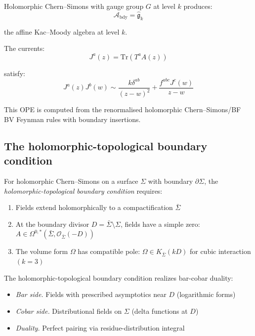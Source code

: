 \begin{example}
Holomorphic Chern--Simons with gauge group $G$ at level $k$ produces:
\[\mathcal{A}_{\text{bdy}} = \widehat{\mathfrak{g}}_k\]

the affine Kac--Moody algebra at level $k$.

The currents:
\[J^a(z) = \text{Tr}(T^a A(z))\]

satisfy:
\[J^a(z) J^b(w) \sim \frac{k \delta^{ab}}{(z-w)^2} +
\frac{f^{abc} J^c(w)}{z-w}\]

This OPE is computed from the renormalised holomorphic
Chern--Simons/BF BV Feynman rules with boundary insertions.
\end{example}

\subsection{The holomorphic-topological boundary condition}

\begin{definition}
For holomorphic Chern--Simons on a surface $\Sigma$ with boundary $\partial \Sigma$,
the \emph{holomorphic-topological boundary condition} requires:
\begin{enumerate}
\item Fields extend holomorphically to a compactification $\bar{\Sigma}$
\item At the boundary divisor $D = \bar{\Sigma} \setminus \Sigma$, fields have
a simple zero: $A \in \Omega^{0,*}(\bar{\Sigma}, \mathcal{O}_{\bar{\Sigma}}(-D))$
\item The volume form $\Omega$ has compatible pole: $\Omega \in K_{\bar{\Sigma}}(kD)$
for cubic interaction $(k=3)$
\end{enumerate}
\end{definition}

\begin{remark}
\label{rem:bar-cobar-ht-boundary}
The holomorphic-topological boundary condition realizes bar-cobar duality:
\begin{itemize}
\item \emph{Bar side.} Fields with prescribed asymptotics near $D$ (logarithmic
forms)
\item \emph{Cobar side.} Distributional fields on $\Sigma$ (delta functions at $D$)
\item \emph{Duality.} Perfect pairing via residue-distribution integral
\end{itemize}
\end{remark}

